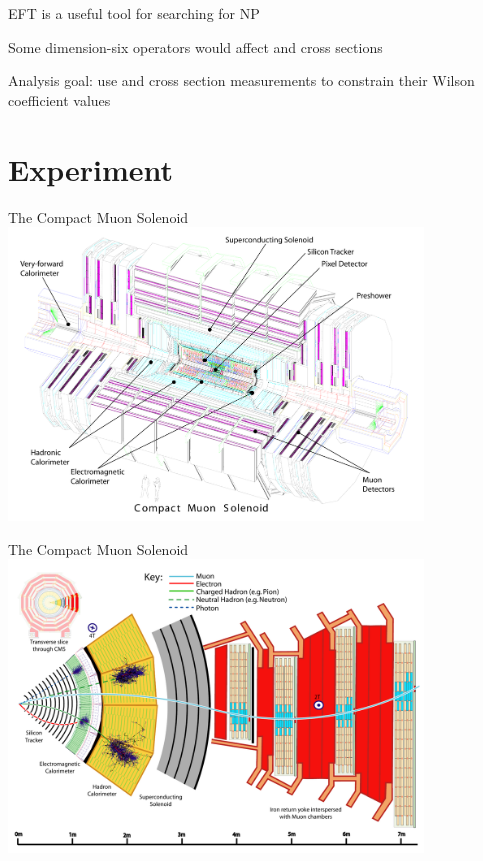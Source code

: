 \documentclass[professionalfont,fleqn]{beamer}
\begin{document}
\begin{frame}[standout]
  EFT is a useful tool for searching for NP

  \vspace{1cm}

  Some dimension-six operators would affect \ttW and \ttZ cross sections

  \vspace{1cm}

  Analysis goal: use \ttW and \ttZ cross section measurements to constrain their Wilson coefficient values
\end{frame}

\section{Experiment}

\begin{frame}{The Compact Muon Solenoid}
  \centering
  \includegraphics[width=11cm]{figures/cms_complete_labelled}
\end{frame}

\begin{frame}{The Compact Muon Solenoid}
  \centering
  \includegraphics[width=11cm]{figures/cms_slice_white}
\end{frame}
\end{document}
